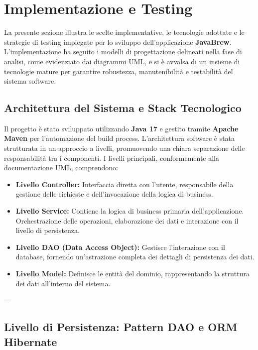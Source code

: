 
\section{Implementazione e Testing}

La presente sezione illustra le scelte implementative, le tecnologie adottate e le strategie di testing impiegate per lo sviluppo dell'applicazione \textbf{JavaBrew}. L'implementazione ha seguito i modelli di progettazione delineati nella fase di analisi, come evidenziato dai diagrammi UML, e si è avvalsa di un insieme di tecnologie mature per garantire robustezza, manutenibilità e testabilità del sistema software.

\subsection{Architettura del Sistema e Stack Tecnologico}

Il progetto è stato sviluppato utilizzando \textbf{Java 17} e gestito tramite \textbf{Apache Maven} per l'automazione del build process. L'architettura software è stata strutturata in un approccio a livelli, promuovendo una chiara separazione delle responsabilità tra i componenti. I livelli principali, conformemente alla documentazione UML, comprendono:
\begin{itemize}
\item \textbf{Livello Controller:} Interfaccia diretta con l'utente, responsabile della gestione delle richieste e dell'invocazione della logica di business.
\item \textbf{Livello Service:} Contiene la logica di business primaria dell'applicazione. Orchestrazione delle operazioni, elaborazione dei dati e interazione con il livello di persistenza.
\item \textbf{Livello DAO (Data Access Object):} Gestisce l'interazione con il database, fornendo un'astrazione completa dei dettagli di persistenza dei dati.
\item \textbf{Livello Model:} Definisce le entità del dominio, rappresentando la struttura dei dati all'interno del sistema.
\end{itemize}

---

\subsection{Livello di Persistenza: Pattern DAO e ORM Hibernate}

